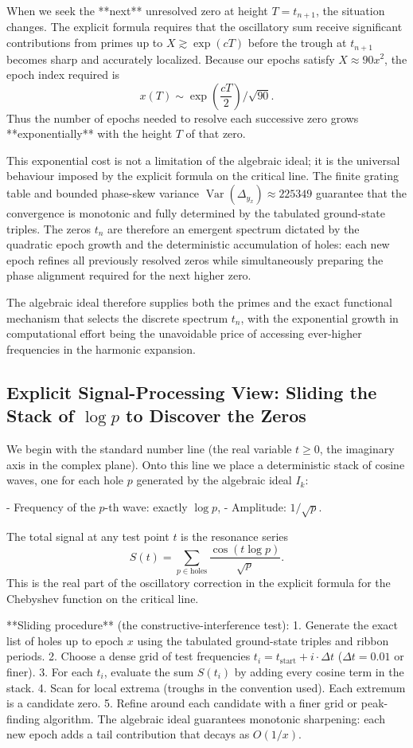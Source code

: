 \documentclass[11pt,a4paper]{article}
\begin{document}
When we seek the **next** unresolved zero at height \(T = t_{n+1}\), the situation changes. The explicit formula requires that the oscillatory sum receive significant contributions from primes up to \(X\gtrsim\exp(cT)\) before the trough at \(t_{n+1}\) becomes sharp and accurately localized. Because our epochs satisfy \(X\approx90x^2\), the epoch index required is
\[
x(T)\sim\exp\left(\frac{cT}{2}\right)/\sqrt{90}.
\]
Thus the number of epochs needed to resolve each successive zero grows **exponentially** with the height \(T\) of that zero.

This exponential cost is not a limitation of the algebraic ideal; it is the universal behaviour imposed by the explicit formula on the critical line. The finite grating table and bounded phase-skew variance \(\operatorname{Var}(\Delta_{y_x})\approx225349\) guarantee that the convergence is monotonic and fully determined by the tabulated ground-state triples. The zeros \(t_n\) are therefore an emergent spectrum dictated by the quadratic epoch growth and the deterministic accumulation of holes: each new epoch refines all previously resolved zeros while simultaneously preparing the phase alignment required for the next higher zero.

The algebraic ideal therefore supplies both the primes and the exact functional mechanism that selects the discrete spectrum \(t_n\), with the exponential growth in computational effort being the unavoidable price of accessing ever-higher frequencies in the harmonic expansion.


\subsection{Explicit Signal-Processing View: Sliding the Stack of \(\log p\) to Discover the Zeros}

We begin with the standard number line (the real variable \(t \ge 0\), the imaginary axis in the complex plane). Onto this line we place a deterministic stack of cosine waves, one for each hole \(p\) generated by the algebraic ideal \(I_k\):

- Frequency of the \(p\)-th wave: exactly \(\log p\),
- Amplitude: \(1/\sqrt{p}\).

The total signal at any test point \(t\) is the resonance series
\[
S(t) = \sum_{p \in \text{holes}} \frac{\cos(t \log p)}{\sqrt{p}}.
\]
This is the real part of the oscillatory correction in the explicit formula for the Chebyshev function on the critical line.

**Sliding procedure** (the constructive-interference test):
1. Generate the exact list of holes up to epoch \(x\) using the tabulated ground-state triples and ribbon periods.
2. Choose a dense grid of test frequencies \(t_i = t_{\text{start}} + i \cdot \Delta t\) (\(\Delta t = 0.01\) or finer).
3. For each \(t_i\), evaluate the sum \(S(t_i)\) by adding every cosine term in the stack.
4. Scan for local extrema (troughs in the convention used). Each extremum is a candidate zero.
5. Refine around each candidate with a finer grid or peak-finding algorithm. The algebraic ideal guarantees monotonic sharpening: each new epoch adds a tail contribution that decays as \(O(1/x)\).
\end{document}
